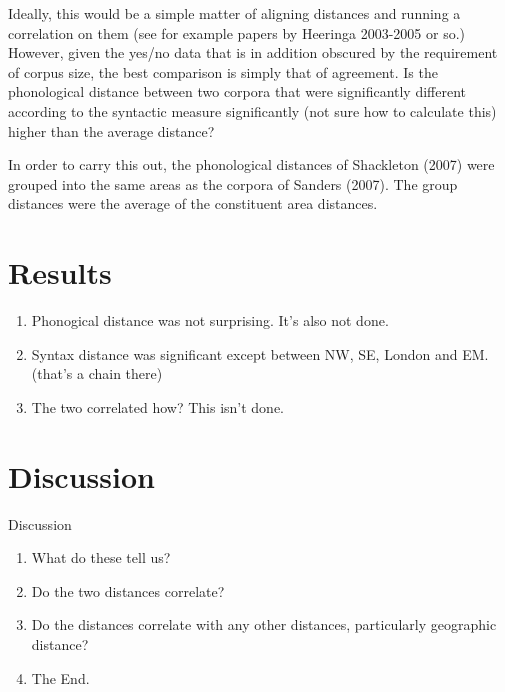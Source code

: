 \documentclass[11pt]{article}
\begin{document}
Ideally, this would be a simple matter of aligning distances and
running a correlation on them (see for example papers by Heeringa
2003-2005 or so.) However, given the yes/no data that is in addition
obscured by the requirement of corpus size, the best comparison is
simply that of agreement. Is the phonological distance between two corpora that
were significantly different according to the syntactic measure
significantly (not sure how to calculate this) higher than the average
distance?

In order to carry this out, the phonological distances of Shackleton
(2007) were grouped into the same areas as the corpora of Sanders
(2007). The group distances were the average of the constituent area distances.
\section{Results}
\begin{enumerate}
\item Phonogical distance was not surprising. It's also not done.
\item Syntax distance was significant except between NW, SE,
  London and EM. (that's a chain there)
\item The two correlated how? This isn't done.
\end{enumerate}
\section{Discussion}

Discussion
  \begin{enumerate}
  \item What do these tell us?
  \item Do the two distances correlate?
  \item Do the distances correlate with any other distances,
    particularly geographic distance?
  \item The End.
  \end{enumerate}
\end{document}
